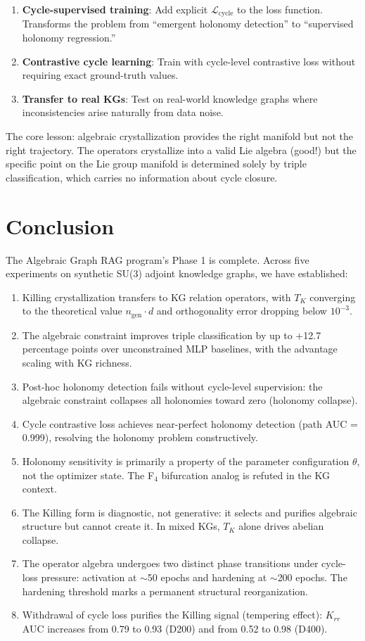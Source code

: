 \documentclass[11pt,letterpaper]{article}
\newcommand{\KL}{\mathcal{L}}
\begin{document}
\begin{enumerate}[noitemsep]
\item \textbf{Cycle-supervised training}: Add explicit $\KL_{\text{cycle}}$ to the loss function. Transforms the problem from ``emergent holonomy detection'' to ``supervised holonomy regression.''
\item \textbf{Contrastive cycle learning}: Train with cycle-level contrastive loss without requiring exact ground-truth values.
\item \textbf{Transfer to real KGs}: Test on real-world knowledge graphs where inconsistencies arise naturally from data noise.
\end{enumerate}

The core lesson: algebraic crystallization provides the right manifold but not the right trajectory. The operators crystallize into a valid Lie algebra (good!) but the specific point on the Lie group manifold is determined solely by triple classification, which carries no information about cycle closure.

\section{Conclusion}

The Algebraic Graph RAG program's Phase 1 is complete. Across five experiments on synthetic SU(3) adjoint knowledge graphs, we have established:

\begin{enumerate}[noitemsep]
\item Killing crystallization transfers to KG relation operators, with $T_K$ converging to the theoretical value $n_{\text{gen}} \cdot d$ and orthogonality error dropping below $10^{-3}$.
\item The algebraic constraint improves triple classification by up to +12.7 percentage points over unconstrained MLP baselines, with the advantage scaling with KG richness.
\item Post-hoc holonomy detection fails without cycle-level supervision: the algebraic constraint collapses all holonomies toward zero (holonomy collapse).
\item Cycle contrastive loss achieves near-perfect holonomy detection (path AUC = 0.999), resolving the holonomy problem constructively.
\item Holonomy sensitivity is primarily a property of the parameter configuration $\theta$, not the optimizer state. The F$_4$ bifurcation analog is refuted in the KG context.
\item The Killing form is diagnostic, not generative: it selects and purifies algebraic structure but cannot create it. In mixed KGs, $T_K$ alone drives abelian collapse.
\item The operator algebra undergoes two distinct phase transitions under cycle-loss pressure: activation at $\sim$50 epochs and hardening at $\sim$200 epochs. The hardening threshold marks a permanent structural reorganization.
\item Withdrawal of cycle loss purifies the Killing signal (tempering effect): $K_{rr}$ AUC increases from 0.79 to 0.93 (D200) and from 0.52 to 0.98 (D400).
\end{enumerate}
\end{document}

